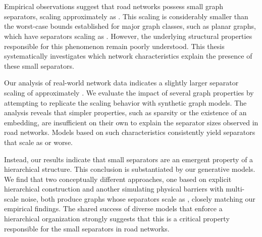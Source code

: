 \section*{\abstractname}

Empirical observations suggest that road networks possess small graph separators, scaling approximately as .
This scaling is considerably smaller than the worst-case bounds established for major graph classes, such as planar graphs, which have separators scaling as .
However, the underlying structural properties responsible for this phenomenon remain poorly understood.
This thesis systematically investigates which network characteristics explain the presence of these small separators.

Our analysis of real-world network data indicates a slightly larger separator scaling of approximately .
We evaluate the impact of several graph properties by attempting to replicate the scaling behavior with synthetic graph models.
The analysis reveals that simpler properties, such as sparsity or the existence of an embedding, are insufficient on their own to explain the separator sizes observed in road networks.
Models based on such characteristics consistently yield separators that scale as  or worse.

Instead, our results indicate that small separators are an emergent property of a hierarchical structure.
This conclusion is substantiated by our generative models.
We find that two conceptually different approaches, one based on explicit hierarchical construction and another simulating physical barriers with multi-scale noise, both produce graphs whose separators scale as , closely matching our empirical findings.
The shared success of diverse models that enforce a hierarchical organization strongly suggests that this is a critical property responsible for the small separators in road networks.
